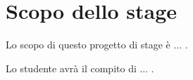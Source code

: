\section*{Scopo dello stage}
Lo scopo di questo progetto di stage è ... .

Lo studente avrà il compito di ... .

